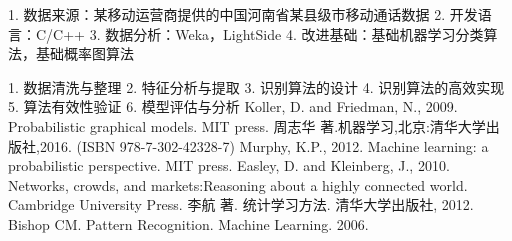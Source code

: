 \assignReq
{1. 数据来源：某移动运营商提供的中国河南省某县级市移动通话数据}
{2. 开发语言：C/C++}
{3. 数据分析：Weka，LightSide}
{4. 改进基础：基础机器学习分类算法，基础概率图算法}

\assignWork
{1. 数据清洗与整理}
{2. 特征分析与提取}
{3. 识别算法的设计}
{4. 识别算法的高效实现}
{5. 算法有效性验证}
{6. 模型评估与分析}
\assignRef
{Koller, D. and Friedman, N., 2009. Probabilistic graphical models. MIT press.}
{周志华 著.机器学习,北京:清华大学出版社,2016. (ISBN 978-7-302-42328-7)}
{Murphy, K.P., 2012. Machine learning: a probabilistic perspective. MIT press.}
{Easley, D. and Kleinberg, J., 2010. Networks, crowds, and markets:Reasoning} 
{about a highly connected world. Cambridge University Press.}
{李航 著. 统计学习方法. 清华大学出版社, 2012.}
{Bishop CM. Pattern Recognition. Machine Learning. 2006.}

